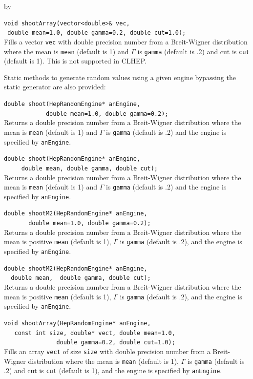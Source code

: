\documentclass[twoside]{article}
\newcommand{\comp}[1]{\texttt{#1}}%
\newcommand{\entrylabel}[1]{\mbox{\textbf{{#1}}}\hfil}%
\newenvironment{entry}
{\begin{list}{}%
    {\renewcommand{\makelabel}{\entrylabel}%
     \setlength{\labelwidth}{90pt}%
     \setlength{\leftmargin}{\labelwidth}
     \advance\leftmargin by \labelsep%
      }%
    }%
  {\end{list}}
\newcommand{\Entrylabel}[1]%
{\raisebox{0pt}[1ex][0pt]{\makebox[\labelwidth][l]%
    {\parbox[t]{\labelwidth}{\hspace{0pt}\textbf{{#1}}}}}}
\newenvironment{Entry}%
{\renewcommand{\entrylabel}{\Entrylabel}\begin{entry}}%
  {\end{entry}}
\begin{document}
\begin{description}
\begin{Entry}
    \verb+void shootArray(vector<double>& vec,+\\
    \verb+ double mean=1.0, double gamma=0.2, double cut=1.0);+\\
    Fills a vector \comp{vec} with double
    precision number from a Breit-Wigner
    distribution where the mean is \comp{mean} (default is 1)
    and $\Gamma$ is \comp{gamma} (default is .2) and cut is
    \comp{cut} (default is 1).  This is not supported in CLHEP.
    
    Static methods to generate random values using a given engine
    bypassing the static generator are also provided:

    \verb+double shoot(HepRandomEngine* anEngine,+\\
    \verb+            double mean=1.0, double gamma=0.2);+\\
    Returns a double precision number from a Breit-Wigner
    distribution where the mean is \comp{mean} (default is 1)
    and $\Gamma$ is \comp{gamma} (default is .2) and the engine
    is specified by \comp{anEngine}.
    
    \verb+double shoot(HepRandomEngine* anEngine,+\\
    \verb+     double mean, double gamma, double cut);+\\
    Returns a double precision number from a Breit-Wigner
    distribution where the mean is \comp{mean} (default is 1)
    and $\Gamma$ is \comp{gamma} (default is .2) and the engine
    is specified by \comp{anEngine}.
    
    \verb+double shootM2(HepRandomEngine* anEngine,+\\
    \verb+       double mean=1.0, double gamma=0.2);+\\
    Returns a double precision number from a Breit-Wigner
    distribution where the mean is positive \comp{mean} (default is 1),
    $\Gamma$ is \comp{gamma} (default is .2), and the engine
    is specified by \comp{anEngine}.
    
    \verb+double shootM2(HepRandomEngine* anEngine,+\\
    \verb+  double mean,  double gamma, double cut);+\\
    Returns a double precision number from a Breit-Wigner
    distribution where the mean is positive \comp{mean} (default is 1),
    $\Gamma$ is \comp{gamma} (default is .2), and the engine
    is specified by \comp{anEngine}.
    
    \verb+void shootArray(HepRandomEngine* anEngine,+\\
    \verb+   const int size, double* vect, double mean=1.0,+\\
    \verb+               double gamma=0.2, double cut=1.0);+\\
    Fills an array \comp{vect} of size \comp{size} with double
    precision number from a Breit-Wigner
    distribution where the mean is \comp{mean} (default is 1),
    $\Gamma$ is \comp{gamma} (default is .2) and cut is
    \comp{cut} (default is 1), and the engine is specified
    by \comp{anEngine}.


\end{Entry}
\end{description}
\end{document}
